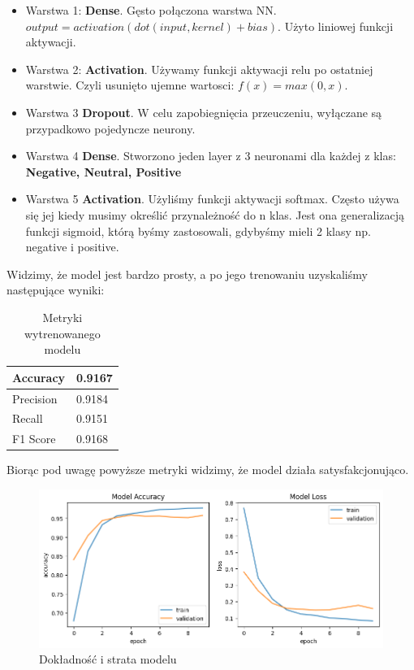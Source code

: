 \documentclass{article}
\begin{document}
\begin{itemize}
  \item Warstwa 1: \textbf{Dense}. Gęsto połączona warstwa NN. $output = activation(dot(input, kernel) + bias)$. Użyto liniowej funkcji aktywacji. 
  \item Warstwa 2: \textbf{Activation}. Używamy funkcji aktywacji relu po ostatniej warstwie. Czyli usunięto ujemne wartosci: $f(x) = max(0, x)$.
  \item Warstwa 3 \textbf{Dropout}. W celu zapobiegnięcia przeuczeniu, wyłączane są przypadkowo pojedyncze neurony.
  \item Warstwa 4 \textbf{Dense}. Stworzono jeden layer z 3 neuronami dla każdej z klas: \textbf{Negative, Neutral, Positive}
  \item Warstwa 5 \textbf{Activation}. Użyliśmy funkcji aktywacji softmax. Często używa się jej kiedy musimy określić przynależność do n klas. Jest ona generalizacją funkcji sigmoid, którą byśmy zastosowali, gdybyśmy mieli 2 klasy np. negative i positive.
\end{itemize}

\newpage

\noindent Widzimy, że model jest bardzo prosty, a po jego trenowaniu uzyskaliśmy następujące wyniki:

    \begin{table}[!h]
    \begin{center}
    \begin{tabular}{ | p{3cm} | l | }
    \hline
        Accuracy  & 0.9167 \\ \hline 
        Precision & 0.9184 \\ \hline
        Recall    & 0.9151 \\ \hline
        F1 Score  & 0.9168 \\ 
    \hline
    \end{tabular}
    \caption{\label{table}Metryki wytrenowanego modelu}   
    \end{center}
    \end{table}

\noindent Biorąc pod uwagę powyższe metryki widzimy, że model działa satysfakcjonująco.

    \begin{figure}[htp]
    \centering
    \includegraphics[scale=0.65]{output.png}
    \caption{Dokładność i strata modelu}
    \label{fig:photo}
    \end{figure}
    
\end{document}
